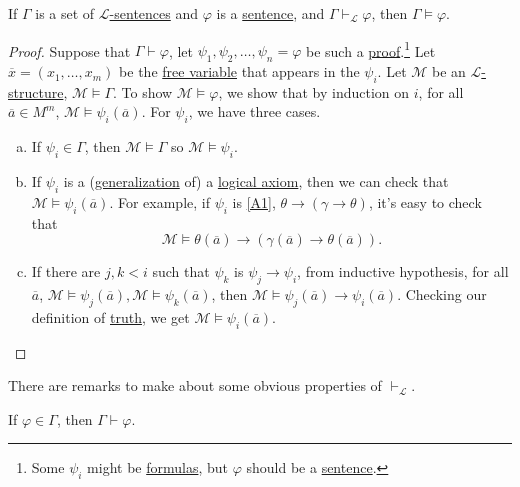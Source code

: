 \begin{lemma}[Soundness]\label{lma:soundness}
	If \(\Gamma \) is a set of \hyperref[def:sentence]{\(\mathcal{L} \)-sentences} and \(\varphi \) is a \hyperref[def:sentence]{sentence}, and \(\Gamma \vdash _{\mathcal{L} } \varphi \), then \(\Gamma \models \varphi \).
\end{lemma}
\begin{proof}
	Suppose that \(\Gamma \vdash \varphi \), let \(\psi _1, \psi _2, \dots , \psi _n = \varphi \) be such a \hyperref[def:proof]{proof}.\footnote{Some \(\psi _i\) might be \hyperref[def:formula]{formulas}, but \(\varphi \) should be a \hyperref[def:sentence]{sentence}.} Let \(\overline{x} = (x_1, \dots , x_m)\) be the \hyperref[def:free-variable]{free variable} that appears in the \(\psi _i\). Let \(\mathcal{M} \) be an \hyperref[def:structure]{\(\mathcal{L} \)-structure}, \(\mathcal{M} \models \Gamma \). To show \(\mathcal{M} \models \varphi \), we show that by induction on \(i\), for all \(\overline{a} \in M^m\), \(\mathcal{M} \models \psi _i(\overline{a} )\). For \(\psi _i\), we have three cases.
	\begin{enumerate}[(a)]
		\item If \(\psi _i\in \Gamma \), then \(\mathcal{M} \models \Gamma \) so \(\mathcal{M} \models \psi _i\).
		\item If \(\psi _i\) is a (\hyperref[def:generalization]{generalization} of) a \hyperref[def:logical-axioms]{logical axiom}, then we can check that \(\mathcal{M} \models \psi _i(\overline{a} )\). For example, if \(\psi _i\) is \autoref{A1}, \(\theta \to (\gamma \to \theta )\), it's easy to check that
		      \[
			      \mathcal{M} \models \theta (\overline{a} ) \to  (\gamma (\overline{a} ) \to \theta (\overline{a} )).
		      \]
		\item If there are \(j, k < i\) such that \(\psi _k\) is \(\psi _j \to \psi _i\), from inductive hypothesis, for all \(\overline{a} \), \(\mathcal{M} \models \psi _j(\overline{a} ), \mathcal{M} \models \psi _k(\overline{a} )\), then \(\mathcal{M} \models \psi _j(\overline{a} ) \to \psi _i(\overline{a} )\). Checking our definition of \hyperref[def:truth]{truth}, we get \(\mathcal{M} \models \psi _i(\overline{a} )\).
	\end{enumerate}
\end{proof}

There are remarks to make about some obvious properties of \(\vdash _{\mathcal{L} }\).

\begin{remark}
	If \(\varphi \in \Gamma \), then \(\Gamma \vdash \varphi \).
\end{remark}

